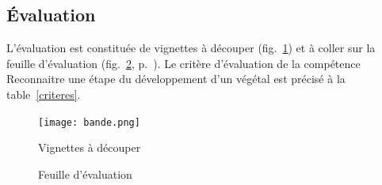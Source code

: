 \subsection{Évaluation}
L’évaluation est constituée de vignettes à découper (fig.~\ref{bande}) et à coller sur la feuille d’évaluation (fig.~\ref{eval}, p.~\pageref{eval}). Le critère d’évaluation de la compétence \og Reconnaitre une étape du développement d’un végétal \fg{} est précisé à la table~\ref{criteres}.

\begin{figure}[h!tbp]
\centering
\noindent
\texttt{[image: bande.png]}
\caption{Vignettes à découper}
\label{bande}
\end{figure}

\begin{figure}[h!tbp]
\centering
\noindent
{}
\caption{Feuille d’évaluation}
\label{eval}
\end{figure}

